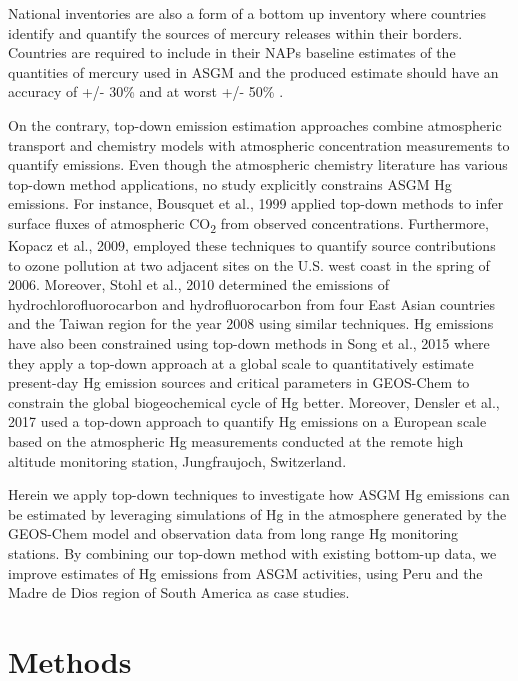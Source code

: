 \begin{flushleft}
National inventories are also a form of a bottom up inventory where countries identify and quantify the sources of mercury releases within their borders. Countries are required to include in their NAPs baseline estimates of the quantities of mercury used in ASGM and the produced estimate should have an accuracy of +/- 30\% and at worst +/- 50\% \cite{united_nations_environment_programme_estimating_2017}.
\end{flushleft}
\begin{flushleft}
On the contrary, top-down emission estimation approaches combine atmospheric transport and chemistry models with atmospheric concentration measurements to quantify emissions. Even though the atmospheric chemistry literature has various top-down method applications, no study explicitly constrains ASGM Hg emissions. For instance, Bousquet et al., 1999 applied top-down methods to infer surface fluxes of atmospheric CO\textsubscript{2} from observed concentrations\cite{bousquet_inverse_1999}. Furthermore, Kopacz et al., 2009, employed these techniques to quantify source contributions to ozone pollution at two adjacent sites on the U.S. west coast in the spring of 2006. Moreover, Stohl et al., 2010 determined the emissions of hydrochlorofluorocarbon and hydrofluorocarbon from four East Asian countries and the Taiwan region for the year 2008 using similar techniques. Hg emissions have also been constrained using top-down methods in Song et al., 2015 where they apply a top-down approach at a global scale to quantitatively estimate present-day Hg emission sources and critical parameters in GEOS-Chem to constrain the global biogeochemical cycle of Hg better. Moreover, Densler et al., 2017 used a top-down approach to quantify Hg emissions on a European scale based on the atmospheric Hg measurements conducted at the remote high altitude monitoring station, Jungfraujoch, Switzerland. 
\end{flushleft}
\begin{flushleft}
Herein we apply top-down techniques to investigate how ASGM Hg emissions can be estimated by leveraging simulations of Hg in the atmosphere generated by the GEOS-Chem model and observation data from long range Hg monitoring stations. By combining our top-down method with existing bottom-up data, we improve estimates of Hg emissions from ASGM activities, using Peru and the Madre de Dios region of South America as case studies.
\end{flushleft}

\section{Methods}

